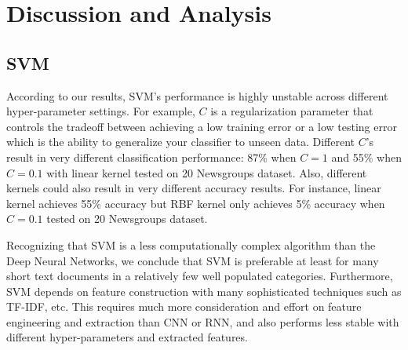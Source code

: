 \documentclass{article}
\begin{document}

\section{Discussion and Analysis}
\subsection{SVM}
According to our results, SVM’s performance is highly unstable across different hyper-parameter settings.  For example, $C$ is a regularization parameter that controls the tradeoff between achieving a low training error or a low testing error which is the ability to generalize your classifier to unseen data. Different $C$’s result in very different classification performance: 87\% when $C=1$ and 55\% when $C=0.1$ with linear kernel tested on 20 Newsgroups dataset.  Also, different kernels could also result in very different accuracy results. For instance, linear kernel achieves 55\% accuracy but RBF kernel only achieves 5\% accuracy when $C=0.1$ tested on 20 Newsgroups dataset.

Recognizing that SVM is a less computationally complex algorithm than the Deep Neural Networks, we conclude that SVM is preferable at least for many short text documents in a relatively few well populated categories. Furthermore, SVM depends on feature construction with many sophisticated techniques such as TF-IDF, etc. This requires much more consideration and effort on feature engineering and extraction than CNN or RNN, and also performs less stable with different hyper-parameters and extracted features.
\end{document}
